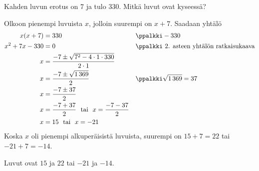 \begin{esimerkki}
Kahden luvun erotus on $7$ ja tulo $330$. Mitkä luvut ovat kyseessä?
\begin{esimratk}
Olkoon pienempi luvuista $x$, jolloin suurempi on $x+7$. Saadaan yhtälö
\begin{align*}
x(x+7) &= 330 && \ppalkki -330 \\
x^2+7x-330 &= 0 && \ppalkki \text{ 2. asteen yhtälön ratkaisukaava}\\
x&=\frac{-7 \pm \sqrt{7^2-4\cdot 1 \cdot 330}}{2\cdot 1} \\
x&=\frac{-7 \pm \sqrt{1\,369}}{2}  &&	\ppalkki \sqrt{1\,369} = 37\\
x&=\frac{-7 \pm 37}{2}  \\
x&=\frac{-7 + 37}{2}\  \text{ tai } \  x = \frac{-7 - 37}{2}  \\
x&=15\  \text{ tai } \ x = -21
\end{align*}
Koska $x$ oli pienempi alkuperäisistä luvuista, suurempi on $15+7=22$ tai
$-21+7=-14$.
\end{esimratk}
\begin{esimvast}
Luvut ovat $15$ ja $22$ tai $-21$ ja $-14$.
\end{esimvast}
\end{esimerkki}



